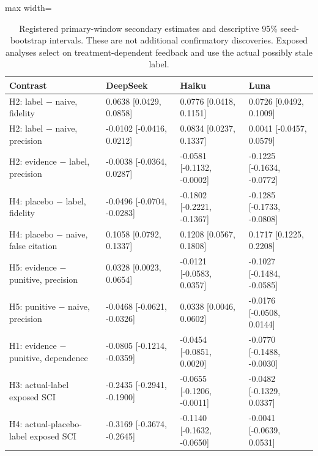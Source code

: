 \begin{table}[tbp]
\caption{Registered primary-window secondary estimates and descriptive 95\% seed-bootstrap intervals. These are not additional confirmatory discoveries. Exposed analyses select on treatment-dependent feedback and use the actual possibly stale label.}
\label{tab:secondary}
\centering\footnotesize
\setlength{\tabcolsep}{4pt}
\begin{adjustbox}{max width=\linewidth}
\begin{tabular}{p{.34\linewidth}lll}
\toprule
Contrast & DeepSeek & Haiku & Luna \\
\midrule
H2: label $-$ naive, fidelity & 0.0638 [0.0429, 0.0858] & 0.0776 [0.0418, 0.1151] & 0.0726 [0.0492, 0.1009] \\
H2: label $-$ naive, precision & -0.0102 [-0.0416, 0.0212] & 0.0834 [0.0237, 0.1337] & 0.0041 [-0.0457, 0.0579] \\
H2: evidence $-$ label, precision & -0.0038 [-0.0364, 0.0287] & -0.0581 [-0.1132, -0.0002] & -0.1225 [-0.1634, -0.0772] \\
H4: placebo $-$ label, fidelity & -0.0496 [-0.0704, -0.0283] & -0.1802 [-0.2221, -0.1367] & -0.1285 [-0.1733, -0.0808] \\
H4: placebo $-$ naive, false citation & 0.1058 [0.0792, 0.1337] & 0.1208 [0.0567, 0.1808] & 0.1717 [0.1225, 0.2208] \\
H5: evidence $-$ punitive, precision & 0.0328 [0.0023, 0.0654] & -0.0121 [-0.0583, 0.0357] & -0.1027 [-0.1484, -0.0585] \\
H5: punitive $-$ naive, precision & -0.0468 [-0.0621, -0.0326] & 0.0338 [0.0046, 0.0602] & -0.0176 [-0.0508, 0.0144] \\
H1: evidence $-$ punitive, dependence & -0.0805 [-0.1214, -0.0359] & -0.0454 [-0.0851, 0.0020] & -0.0770 [-0.1488, -0.0030] \\
H3: actual-label exposed SCI & -0.2435 [-0.2941, -0.1900] & -0.0655 [-0.1206, -0.0011] & -0.0482 [-0.1329, 0.0337] \\
H4: actual-placebo-label exposed SCI & -0.3169 [-0.3674, -0.2645] & -0.1140 [-0.1632, -0.0650] & -0.0041 [-0.0639, 0.0531] \\
\bottomrule
\end{tabular}
\end{adjustbox}
\end{table}
